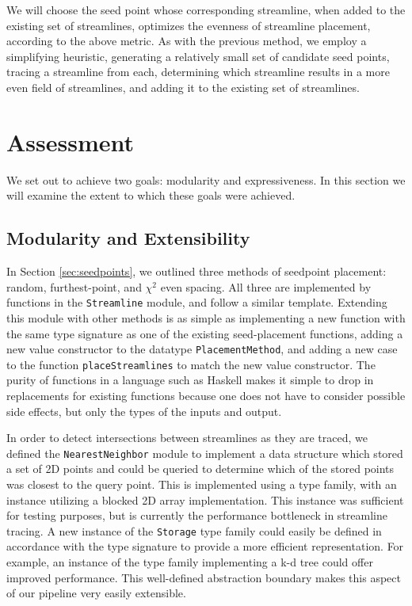 \documentclass[twocolumn]{article}
\begin{document}
We will choose the seed point whose corresponding streamline, when added to the
existing set of streamlines, optimizes the evenness of streamline placement,
according to the above metric. As with the previous method, we employ a
simplifying heuristic, generating a relatively small set of candidate seed
points, tracing a streamline from each, determining which streamline results in
a more even field of streamlines, and adding it to the existing set of
streamlines.

\section{Assessment}
We set out to achieve two goals: modularity and expressiveness. In this section
we will examine the extent to which these goals were achieved.

\subsection{Modularity and Extensibility}
In Section \ref{sec:seedpoints}, we outlined three methods of seedpoint
placement: random, furthest-point, and $\chi^2$ even spacing. All three are
implemented by functions in the \texttt{Streamline} module, and follow a
similar template. Extending this module with other methods is as simple as
implementing a new function with the same type signature as one of the existing
seed-placement functions, adding a new value constructor to the datatype
\texttt{PlacementMethod}, and adding a new case to the function
\texttt{placeStreamlines} to match the new value constructor. The purity of
functions in a language such as Haskell makes it simple to drop in replacements
for existing functions because one does not have to consider possible side
effects, but only the types of the inputs and output.

In order to detect intersections between streamlines as they are traced, we
defined the \texttt{NearestNeighbor} module to implement a data structure which
stored a set of 2D points and could be queried to determine which of the stored
points was closest to the query point. This is implemented using a type family,
with an instance utilizing a blocked 2D array implementation. This instance was
sufficient for testing purposes, but is currently the performance bottleneck in
streamline tracing. A new instance of the \texttt{Storage} type family could
easily be defined in accordance with the type signature to provide a more
efficient representation. For example, an instance of the type family
implementing a k-d tree could offer improved performance. This well-defined
abstraction boundary makes this aspect of our pipeline very easily extensible.
\end{document}
